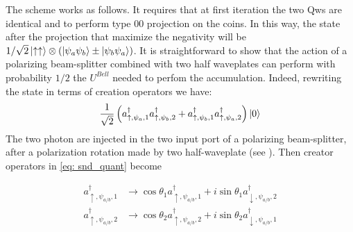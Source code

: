 \documentclass[
	aps, pra,
	superscriptaddress, twocolumn,
	floatfix,
	10pt
]{revtex4-1}
\begin{document}
The scheme works as follows. It requires that at first iteration the two Qws are identical and to perform type 00 projection on the coins. In this way, the state after the projection that maximize the negativity will be $1/\sqrt{2}\ket{\uparrow \uparrow}\otimes(\ket{\psi_a\psi_b}\pm\ket{\psi_b\psi_a})$. 
It is straightforward to show that the action of a polarizing beam-splitter combined with two half waveplates can perform with probability $1/2$ the $U^{Bell}$ needed to perfom the accumulation.
Indeed, rewriting the state in terms of creation operators we have:
\begin{equation}
    \frac{1}{\sqrt{2}}\left(a^{\dagger}_{\uparrow, \psi_a,1}a^{\dagger}_{\uparrow, \psi_b,2}+a^{\dagger}_{\uparrow, \psi_b,1}a^{\dagger}_{\uparrow, \psi_a,2} \right)\ket{0} 
    \label{eq: snd_quant}
\end{equation}
The two photon are injected in the two input port of a polarizing beam-splitter, after a polarization rotation made by two half-waveplate (see ). Then creator operators in \cref{eq: snd_quant} become

\begin{equation}\begin{aligned}
    a^{\dagger}_{\uparrow, \psi_{a/b},1} & \rightarrow \cos{\theta_1}a^{\dagger}_{\uparrow, \psi_{a/b},1} + i\sin{\theta_1}a^{\dagger}_{\downarrow, \psi_{a/b},2} \\
    a^{\dagger}_{\uparrow, \psi_{a/b},2} & \rightarrow \cos{\theta_2}a^{\dagger}_{\uparrow, \psi_{a/b},2} + i\sin{\theta_2}a^{\dagger}_{\downarrow, \psi_{a/b},1}
\end{aligned}\end{equation}
\end{document}
